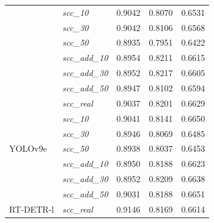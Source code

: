 \begin{table}[h!]
{\begin{tabular}{l|l|c|c|c}
                                      & \textit{scc\_10}        & 0.9042                     & 0.8070                     & 0.6531                     \\
                                      & \textit{scc\_30}        & 0.9042                     & 0.8106                     & 0.6568                     \\
                                      & \textit{scc\_50}        & 0.8935                     & 0.7951                     & 0.6422                     \\
                                      & \textit{scc\_add\_10}   & 0.8954                     & 0.8211                     & 0.6615                     \\
                                      & \textit{scc\_add\_30}   & 0.8952                     & \cellcolor{blue!10}0.8217  & 0.6605                     \\
                                      & \textit{scc\_add\_50}   & 0.8947                     & 0.8102                     & 0.6594                     \\
        \midrule
        \multirow[t]{7}{*}{YOLOv9e}   & \textit{scc\_real}      & 0.9037                     & 0.8201                     & 0.6629                     \\
                                      & \textit{scc\_10}        & \cellcolor{blue!10}0.9041  & 0.8141                     & 0.6650                     \\
                                      & \textit{scc\_30}        & 0.8946                     & 0.8069                     & 0.6485                     \\
                                      & \textit{scc\_50}        & 0.8938                     & 0.8037                     & 0.6453                     \\
                                      & \textit{scc\_add\_10}   & 0.8950                     & 0.8188                     & 0.6623                     \\
                                      & \textit{scc\_add\_30}   & 0.8952                     & \cellcolor{blue!10}0.8209  & 0.6638                     \\
                                      & \textit{scc\_add\_50}   & 0.9031                     & 0.8188                     & \cellcolor{blue!10}0.6651  \\
        \midrule
        \multirow[t]{7}{*}{RT-DETR-l} & \textit{scc\_real}      & 0.9146                     & \cellcolor{blue!10}0.8169  & \cellcolor{blue!10}0.6614  \\

\end{tabular}}
\end{table}

